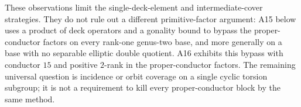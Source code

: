 These observations limit the single-deck-element and intermediate-cover
strategies. They do not rule out a different primitive-factor argument:
A15 below uses a product of deck operators and a gonality bound to bypass
the proper-conductor factors on every rank-one genus-two base, and more
generally on a base with no separable elliptic double quotient. A16
exhibits this bypass with conductor $15$ and positive $2$-rank in the
proper-conductor factors. The remaining universal question is incidence
or orbit coverage on a single cyclic torsion subgroup; it is not a
requirement to kill every proper-conductor block by the same method.
